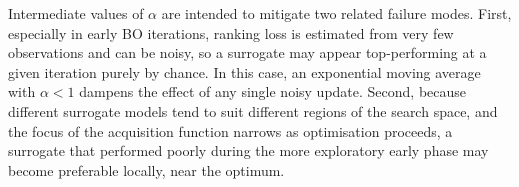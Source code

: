 Intermediate values of $\alpha$ are intended to mitigate two related failure modes. 
First, especially in early BO iterations, ranking loss is estimated from very few observations and can be noisy, so a surrogate may appear top-performing at a given iteration purely by chance.
In this case, an exponential moving average with $\alpha < 1$ dampens the effect of any single noisy update. 
Second, because different surrogate models tend to suit different regions of the search space, and the focus of the acquisition function narrows as optimisation proceeds, a surrogate that performed poorly during the more exploratory early phase may become preferable locally, near the optimum.

